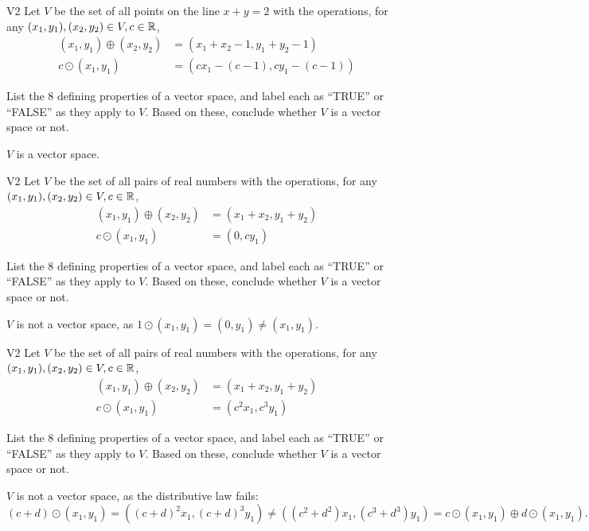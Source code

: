 \begin{problem}{V2}
Let \(V\) be the set of all points on the line \(x+y=2\) with the operations, for any \((x_1,y_1), (x_2,y_2) \in V,c \in \mathbb{R}\),
\begin{align*}
(x_1,y_1) \oplus (x_2,y_2) &= (x_1+x_2-1,y_1+y_2-1) \\
c \odot (x_1,y_1) &= (cx_1-(c-1), cy_1-(c-1))
\end{align*}

  List the 8 defining properties of a vector space, and label each as
  ``TRUE'' or ``FALSE'' as they apply to \(V\). Based on these, conclude whether
  \(V\) is a vector space or not.

\end{problem}
\begin{solution}
\(V\) is a vector space.
\end{solution}

\begin{problem}{V2}
Let \(V\) be the set of all pairs of real numbers with the operations, for any \((x_1,y_1), (x_2,y_2) \in V,c \in \mathbb{R}\),
\begin{align*}
(x_1,y_1) \oplus (x_2,y_2) &= (x_1+x_2,y_1+y_2) \\
c \odot (x_1,y_1) &= (0, cy_1)
\end{align*}

  List the 8 defining properties of a vector space, and label each as
  ``TRUE'' or ``FALSE'' as they apply to \(V\). Based on these, conclude whether
  \(V\) is a vector space or not.
\end{problem}
\begin{solution}
\(V\) is not a vector space, as \(1 \odot (x_1,y_1) = (0,y_1) \neq (x_1,y_1)\).
\end{solution}


\begin{problem}{V2}
Let \(V\) be the set of all pairs of real numbers with the operations, for any \((x_1,y_1), (x_2,y_2) \in V,c \in \mathbb{R}\),
\begin{align*}
(x_1,y_1) \oplus (x_2,y_2) &= (x_1+x_2,y_1+y_2) \\
c \odot (x_1,y_1) &= (c^2x_1, c^3y_1)
\end{align*}

  List the 8 defining properties of a vector space, and label each as
  ``TRUE'' or ``FALSE'' as they apply to \(V\). Based on these, conclude whether
  \(V\) is a vector space or not.
\end{problem}
\begin{solution}
\(V\) is not a vector space, as the  distributive law fails:
\[(c+d) \odot (x_1,y_1) = ( (c+d)^2 x_1, (c+d)^3 y_1) \neq ((c^2+d^2)x_1, (c^3+d^3)y_1) = c \odot (x_1,y_1) \oplus d \odot (x_1,y_1).\]
\end{solution}


